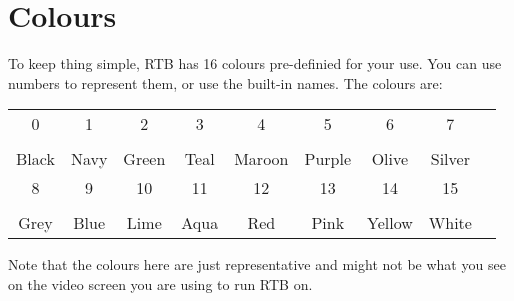 \chapter{Colours}

To keep thing simple, RTB has 16 colours pre-definied for your use. You
can use numbers to represent them, or use the built-in names. The
colours are:

\begin{center}
\begin{tabular}{|c|c|c|c|c|c|c|c|c|}
\hline
0 & 1 & 2 & 3 & 4 & 5 & 6 & 7\\
\colorbox{rtb-black}{\hspace{10mm}}&
\colorbox{rtb-navy}{\hspace{10mm}}&
\colorbox{rtb-green}{\hspace{10mm}}&
\colorbox{rtb-teal}{\hspace{10mm}}&
\colorbox{rtb-maroon}{\hspace{10mm}}&
\colorbox{rtb-purple}{\hspace{10mm}}&
\colorbox{rtb-olive}{\hspace{10mm}}&
\colorbox{rtb-silver}{\hspace{10mm}}\\
Black & Navy & Green & Teal & Maroon & Purple & Olive & Silver\\
\hline
\hline
8 & 9 & 10 & 11 & 12 & 13 & 14 & 15\\
\colorbox{rtb-grey}{\hspace{10mm}}&
\colorbox{rtb-blue}{\hspace{10mm}}&
\colorbox{rtb-lime}{\hspace{10mm}}&
\colorbox{rtb-aqua}{\hspace{10mm}}&
\colorbox{rtb-red}{\hspace{10mm}}&
\colorbox{rtb-fuchsia}{\hspace{10mm}}&
\colorbox{rtb-yellow}{\hspace{10mm}}&
\colorbox{rtb-white}{\hspace{10mm}}\\
Grey & Blue & Lime & Aqua & Red & Pink & Yellow & White\\
\hline
\end{tabular}
\end{center}
Note that the colours here are just representative and might not be what
you see on the video screen you are using to run RTB on.

